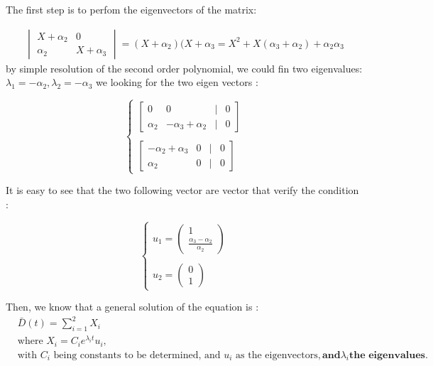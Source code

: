 \documentclass{article}
\begin{document}
	The first step is to perfom the eigenvectors of the matrix:
	
	\begin{align*}
		\begin{vmatrix}
			X+\alpha_2 & 0 \\
			\alpha_2 & X+\alpha_3
		\end{vmatrix} = (X+\alpha_2)(X+\alpha_3=X^2+X(\alpha_3+\alpha_2)+\alpha_2\alpha_3
	\end{align*}
	by simple resolution of the second order polynomial, we could fin two eigenvalues: \newline
	$\lambda_1=-\alpha_2, \lambda_2 = -\alpha_3$
	we looking for the two eigen vectors : 
	
	\[
	\begin{cases}
		\begin{bmatrix}
			0 & 0 & | & 0 \\
			\alpha_2 & -\alpha_3 + \alpha_2 & | & 0
		\end{bmatrix} \\ \\
		\begin{bmatrix}
			-\alpha_2 + \alpha_3 & 0 & | & 0 \\
			\alpha_2 & 0 & | & 0
		\end{bmatrix}
	\end{cases}
	\]
	
	It is easy to see that the two following vector are vector that verify the condition : 
	
	\[
	\begin{cases}
		u_1=\begin{pmatrix}
			1 \\
			\frac{\alpha_3-\alpha_2}{\alpha_2}
		\end{pmatrix} \\ \\
		u_2=\begin{pmatrix}
			0 \\
			1
		\end{pmatrix}
	\end{cases}
	\]
	
	Then, we know that a general solution of the equation is : 
	\begin{align*}
		&\bar{D}
		(t) = \sum_{i=1}^2 X_i \\
		&\text{where } X_i = C_i e^{\lambda_it} u_i, \\
		&\text{with } C_i \text{ being constants to be determined, and } u_i \text{ as the eigenvectors}, \textbf{and} \lambda_i \textbf{the eigenvalues}.
	\end{align*}
	
\end{document}
